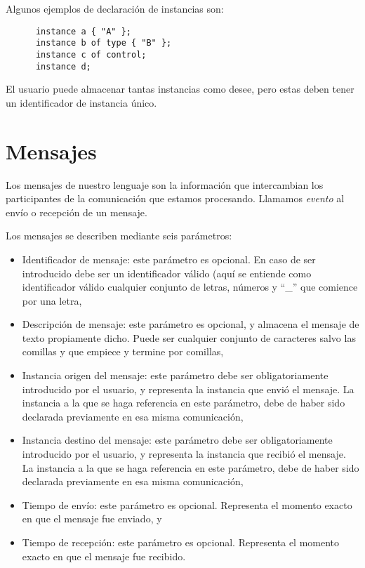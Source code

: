 Algunos ejemplos de declaración de instancias son:

\begin{lstlisting}
      instance a { "A" };
      instance b of type { "B" };
      instance c of control;
      instance d;
\end{lstlisting}

El usuario puede almacenar tantas instancias como desee, pero estas
deben tener un identificador de instancia único.

\section{Mensajes}\label{sec:Mensajes}

Los mensajes de nuestro lenguaje son la información que intercambian
los participantes de la comunicación que estamos procesando. Llamamos
\textit{evento} al envío o recepción de un mensaje.

Los mensajes se describen mediante seis parámetros:

\begin{itemize}
\item Identificador de mensaje: este parámetro es opcional. En caso de
  ser introducido debe ser un identificador válido (aquí se entiende
  como identificador válido cualquier conjunto de letras, números y
  ``\_'' que comience por una letra,
\item Descripción de mensaje: este parámetro es opcional, y almacena el mensaje de
  texto propiamente dicho. Puede ser cualquier conjunto de caracteres
  salvo las comillas y que empiece y termine por comillas,
\item Instancia origen del mensaje: este parámetro debe ser
  obligatoriamente introducido por el usuario, y representa la
  instancia que envió el mensaje. La instancia a la que se haga
  referencia en este parámetro, debe de haber sido declarada
  previamente en esa misma comunicación,
\item Instancia destino del mensaje: este parámetro debe ser
  obligatoriamente introducido por el usuario, y representa la
  instancia que recibió el mensaje. La instancia a la que se haga
  referencia en este parámetro, debe de haber sido declarada
  previamente en esa misma comunicación,
\item Tiempo de envío: este parámetro es opcional. Representa el
  momento exacto en que el mensaje fue enviado, y
\item Tiempo de recepción: este parámetro es opcional. Representa el
  momento exacto en que el mensaje fue recibido.
\end{itemize}

